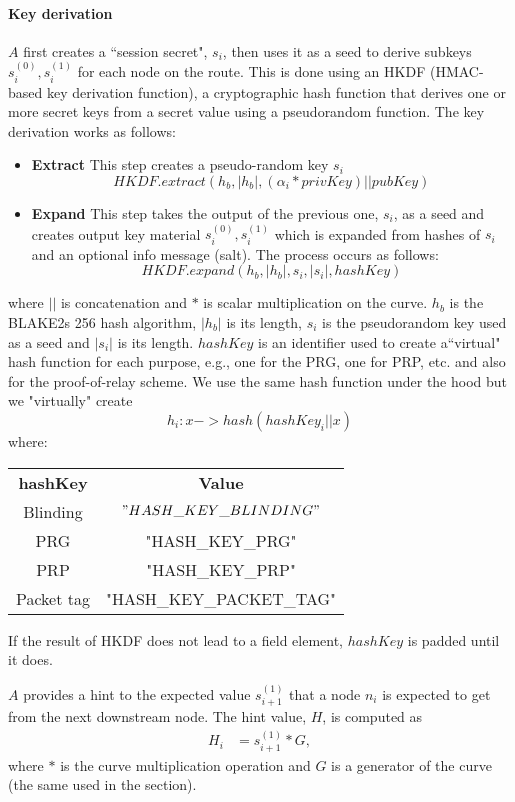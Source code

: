     \paragraph{Key derivation}
    $A$ first creates a ``session secret", $s_i$, then uses it as a seed to derive subkeys $s_i^{(0)},s_i^{(1)}$ for each node on the route. This is done using an HKDF (HMAC-based key derivation function), a cryptographic hash function that derives one or more secret keys from a secret value using a pseudorandom function. The key derivation works as follows:
    \begin{itemize}
        \item \textbf{Extract} This step creates a pseudo-random key $s_i$   
        $$HKDF.extract(h_b, |h_b|, (\alpha_i* privKey) || pubKey)$$   

        \item \textbf{Expand} This step takes the output of the previous one, $s_i$, as a seed and creates output key material $s_i^{(0)},s_i^{(1)}$ which is expanded from hashes of $s_i$ and an optional info message (salt). The process occurs as follows:
        $$HKDF.expand(h_b, |h_b|,s_i, |s_i|, hashKey)$$
    \end{itemize}
    where $||$ is concatenation and $*$ is scalar multiplication on the curve. $h_b$ is the BLAKE2s 256 hash algorithm, $|h_b|$ is its length, $s_i$ is the pseudorandom key used as a seed and $|s_i|$ is its length. $hashKey$ is an identifier used to create a``virtual" hash function for each purpose, e.g., one for the PRG, one for PRP, etc. and also for the proof-of-relay scheme. We use the same hash function under the hood but we "virtually" create 
$$h_i: x -> hash(hashKey_i || x)$$ where: 
\begin{center}
\begin{tabular}{c|c|} 
      \textbf{hashKey} & \textbf{Value}\\
       Blinding& $"HASH\_KEY\_BLINDING"$ \\
      \hline
      PRG & "HASH\_KEY\_PRG" \\
      PRP & "HASH\_KEY\_PRP" \\
      Packet tag & "HASH\_KEY\_PACKET\_TAG" \\
    \end{tabular}
\end{center}
    
If the result of HKDF does not lead to a field element, $hashKey$ is padded until it does. 
    
$A$ provides a hint to the expected value $s_{i+1}^{(1)}$ that a node $n_i$ is expected to get from the next downstream node.
    The hint value, $H$, is computed as 
    \begin{align}  
        H_i&=s_{i+1}^{(1)}*G,
         \end{align}
    where $*$ is the curve multiplication operation and $G$ is a generator of the curve (the same used in the  section). 
    
